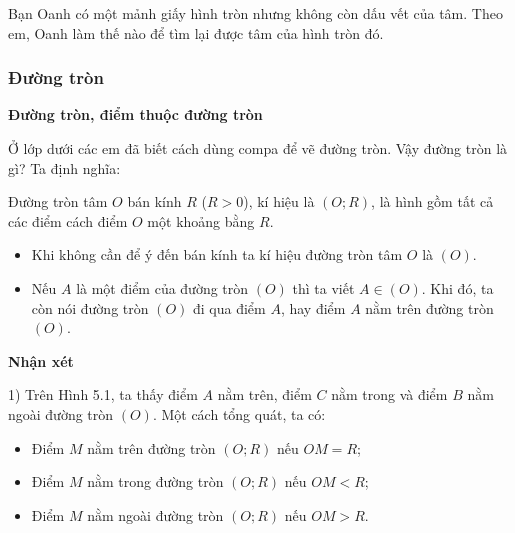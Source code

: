 \begin{lesson}
    Bạn Oanh có một mảnh giấy hình tròn nhưng không còn dấu vết của tâm. Theo em, Oanh làm thế nào để tìm lại được tâm của hình tròn đó.

    \subsubsection{Đường tròn}

    \textbf{Đường tròn, điểm thuộc đường tròn}

    Ở lớp dưới các em đã biết cách dùng compa để vẽ đường tròn. Vậy đường tròn là gì? Ta định nghĩa:

    \begin{keyconcept}
        Đường tròn tâm $O$ bán kính $R$ ($R>0$), kí hiệu là $(O;R)$, là hình gồm tất cả các điểm cách điểm $O$ một khoảng bằng $R$.
    \end{keyconcept}


    \begin{itemize}
        \item Khi không cần để ý đến bán kính ta kí hiệu đường tròn tâm $O$ là $(O)$.
        \item Nếu $A$ là một điểm của đường tròn $(O)$ thì ta viết $A\in(O)$. Khi đó, ta còn nói đường tròn $(O)$ đi qua điểm $A$, hay điểm $A$ nằm trên đường tròn $(O)$.
    \end{itemize}

    \textbf{Nhận xét}

    1) Trên Hình 5.1, ta thấy điểm $A$ nằm trên, điểm $C$ nằm trong và điểm $B$ nằm ngoài đường tròn $(O)$. Một cách tổng quát, ta có:
    \begin{itemize}
        \item Điểm $M$ nằm trên đường tròn $(O;R)$ nếu $OM=R$;
        \item Điểm $M$ nằm trong đường tròn $(O;R)$ nếu $OM<R$;
        \item Điểm $M$ nằm ngoài đường tròn $(O;R)$ nếu $OM>R$.
    \end{itemize}

    \begin{center}


\end{center}
\end{lesson}
